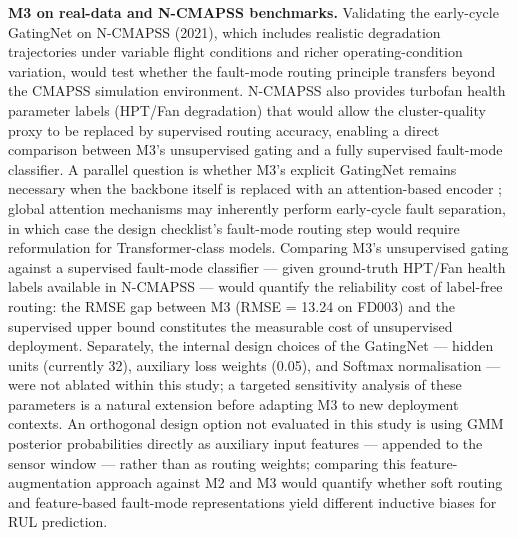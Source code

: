 \documentclass[review,12pt]{elsarticle}
\begin{document}
\textbf{M3 on real-data and N-CMAPSS benchmarks.} Validating the early-cycle GatingNet on N-CMAPSS (2021), which includes realistic degradation trajectories under variable flight conditions and richer operating-condition variation, would test whether the fault-mode routing principle transfers beyond the CMAPSS simulation environment. N-CMAPSS also provides turbofan health parameter labels (HPT/Fan degradation) that would allow the cluster-quality proxy to be replaced by supervised routing accuracy, enabling a direct comparison between M3's unsupervised gating and a fully supervised fault-mode classifier. A parallel question is whether M3's explicit GatingNet remains necessary when the backbone itself is replaced with an attention-based encoder \cite{ref08,ref11,ref13,ref14}; global attention mechanisms may inherently perform early-cycle fault separation, in which case the design checklist's fault-mode routing step would require reformulation for Transformer-class models. Comparing M3's unsupervised gating against a supervised fault-mode classifier --- given ground-truth HPT/Fan health labels available in N-CMAPSS --- would quantify the reliability cost of label-free routing: the RMSE gap between M3 (RMSE = 13.24 on FD003) and the supervised upper bound constitutes the measurable cost of unsupervised deployment. Separately, the internal design choices of the GatingNet --- hidden units (currently 32), auxiliary loss weights (0.05), and Softmax normalisation --- were not ablated within this study; a targeted sensitivity analysis of these parameters is a natural extension before adapting M3 to new deployment contexts. An orthogonal design option not evaluated in this study is using GMM posterior probabilities directly as auxiliary input features --- appended to the sensor window --- rather than as routing weights; comparing this feature-augmentation approach against M2 and M3 would quantify whether soft routing and feature-based fault-mode representations yield different inductive biases for RUL prediction.
\end{document}
